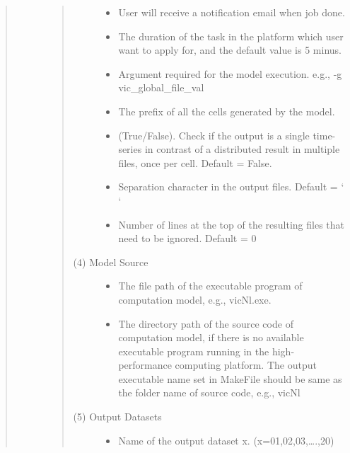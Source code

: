 \documentclass[letterpaper,10pt,english]{sphinxmanual}
\begin{document}
\begin{fulllineitems}
\begin{quote}
\begin{description}
\begin{quote}
\begin{description}
\begin{itemize}
\item {} 
 User will receive a notification email when job done.

\item {} 
 The duration of the task in the platform which user want to apply for, and the default value is 5 minus.

\item {} 
 Argument required for the model execution. e.g., -g vic\_global\_file\_val

\item {} 
 The prefix of all the cells generated by the model.

\item {} 
  (True/False). Check if the output is a single time-series in contrast of a distributed result in multiple files, once per cell. Default = False.

\item {} 
  Separation character in the output files. Default = ‘ ‘

\item {} 
  Number of lines at the top of the resulting files that need to be ignored. Default = 0

\end{itemize}

\item[{(4) Model Source}] \leavevmode\begin{itemize}
\item {} 
 The file path of the executable program of computation model, e.g., vicNl.exe.

\item {} 
 The directory path of the source code of computation model,             if there is no available executable program running in the high-performance computing platform.            The output executable name set in MakeFile should be same as the folder name of source code, e.g., vicNl

\end{itemize}

\item[{(5) Output Datasets}] \leavevmode\begin{itemize}
\item {} 
 Name of the output dataset x. (x=01,02,03,….,20)


\end{itemize}
\end{description}
\end{quote}
\end{description}
\end{quote}
\end{fulllineitems}
\end{document}
